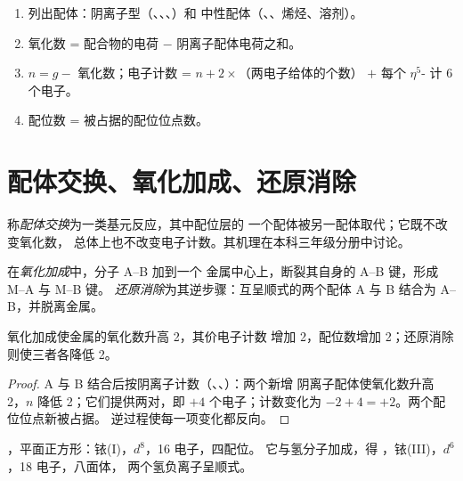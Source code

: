 \begin{method}[有机金属配合物的计数]\label{met:b2:catalytic-cycles:count-organometallic}
\begin{enumerate}
  \item 列出配体：阴离子型（、、、）和
        中性配体（、、烯烃、溶剂）。
  \item 氧化数 = 配合物的电荷 $-$ 阴离子配体电荷之和。
  \item $n = g -$ 氧化数；电子计数 = $n + 2 \times$（两电子给体的个数）
        $+$ 每个 $\eta^5$- 计 6 个电子。
  \item 配位数 = 被占据的配位位点数。
\end{enumerate}
\end{method}

\section{配体交换、氧化加成、还原消除}

\begin{definition}[配体交换]\label{def:b2:catalytic-cycles:ligand-exchange}
称\emph{配体交换}为一类基元反应，其中配位层的
一个配体被另一配体取代；它既不改变氧化数，
总体上也不改变电子计数。其机理在本科三年级分册中讨论。
\end{definition}

\begin{definition}[氧化加成与还原消除]\label{def:b2:catalytic-cycles:oxidative-addition}
在\emph{氧化加成}中，分子 A--B 加到一个
金属中心上，断裂其自身的 A--B 键，形成 M--A 与 M--B 键。
\emph{还原消除}为其逆步骤：互呈顺式的两个配体 A 与 B
结合为 A--B，并脱离金属。
\end{definition}

\begin{proposition}[氧化加成的计数]\label{prop:b2:catalytic-cycles:oa}
氧化加成使金属的氧化数升高 2，其价电子计数
增加 2，配位数增加 2；还原消除则使三者各降低 2。
\end{proposition}

\begin{proof}
A 与 B 结合后按阴离子计数（、、）：两个新增
阴离子配体使氧化数升高 2，$n$ 降低 2；它们提供两对，即 $+4$
个电子；计数变化为 $-2 + 4 = +2$。两个配位位点新被占据。
逆过程使每一项变化都反向。
\end{proof}

\begin{example}[瓦斯卡配合物]\label{ex:b2:catalytic-cycles:vaska}
，平面正方形：铱(I)，$d^8$，16 电子，四配位。
它与氢分子加成，得 ，铱(III)，$d^6$，18 电子，八面体，
两个氢负离子呈顺式。
\end{example}

